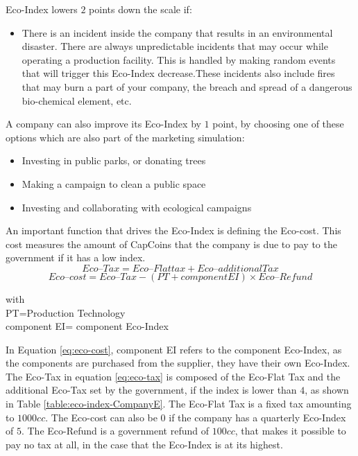 Eco-Index lowers $2$ points down the scale if: 
\begin{itemize}
	\item There is an incident inside the company that results in an environmental disaster. There are always unpredictable incidents that may occur while operating a production facility. This is handled by making random events that will trigger this Eco-Index decrease.These incidents also include fires that may burn a part of your company, the breach and spread of a dangerous bio-chemical element, etc.
\end{itemize}

A company can also improve its Eco-Index by $1$ point, by choosing one of these options which are also part of the marketing simulation: 
\begin{itemize}
	\item Investing in public parks, or donating trees 
\item Making a campaign to clean a public space
\item Investing and collaborating with ecological campaigns
\end{itemize}

An important function that drives the Eco-Index is defining the Eco-cost. This cost measures the amount of CapCoins that the company is due to pay to the government if it has a low index. \\ 
\begin{equation}
Eco–Tax= Eco–Flat tax+ Eco–additionalTax
\label{eq:eco-tax}
\end{equation}
\begin{equation}
Eco–cost= Eco–Tax - (PT + component EI)\times Eco–Refund 
\label{eq:eco-cost}
\end{equation}
\begin{center}
with\\
	PT=Production Technology\\
	component EI= component Eco-Index\\
\end{center}

In Equation \ref{eq:eco-cost}, component EI refers to the component Eco-Index, as the components are purchased from the supplier, they have their own Eco-Index.\\
The Eco-Tax in equation \ref{eq:eco-tax} is composed of the Eco-Flat Tax and the additional Eco-Tax set by the government, if the index is lower than $4$, as shown in Table \ref{table:eco-index-CompanyE}.
The Eco-Flat Tax is a fixed tax amounting to $1000cc$. The Eco-cost can also be $0$ if the company has a quarterly Eco-Index of $5$. The Eco-Refund is a government refund of $100cc$, that makes it possible to pay no tax at all, in the case that the Eco-Index is at its highest. 